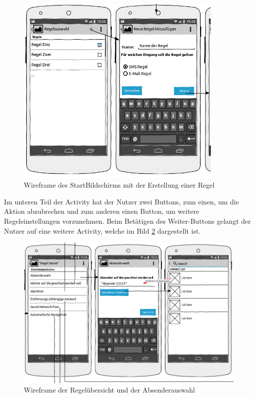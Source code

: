 \begin{figure}[!ht]
\centering
\includegraphics[width=10cm]{Bilder/StartBildschirm.png}
\caption{Wireframe des StartBildschirms mit der Erstellung einer Regel}
\label{Wireframe StartBildschirm}
\centering
\end{figure}

Im unteren Teil der Activity hat der Nutzer zwei Buttons, zum einen, um die Aktion abzubrechen und zum anderen einen Button, um weitere Regeleinstellungen vorzunehmen.
Beim Bet\"atigen des Weiter-Buttons gelangt der Nutzer auf eine weitere Activity, welche im Bild \ref{Wireframe Regeluebersicht} dargestellt ist.

\begin{figure}[!ht]
\centering
\includegraphics[width=16cm]{Bilder/WireframeRegeluebersicht.png}
\caption{Wireframe der Regel\"ubersicht und der Absenderauswahl}
\label{Wireframe Regeluebersicht}
\centering
\end{figure}

